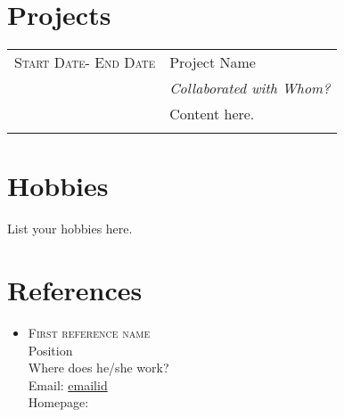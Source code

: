 \section{Projects}
\begin{tabular}[h]{r|p{11cm}}
 \textsc{Start Date- End Date} & Project Name \\&
\emph{Collaborated with Whom?} 
 \\&\footnotesize{Content here.}\\\multicolumn{2}{c}{} \\
 
\end{tabular}

\section{Hobbies}

List your hobbies here.


\newpage
\section{References}

\begin{itemize}

\item \textsc{First reference name} \\
Position \\
Where does he/she work?\\
Email: \href{mailto:emailid}{emailid}\\
Homepage: \href{weblink}{}


\end{itemize}




